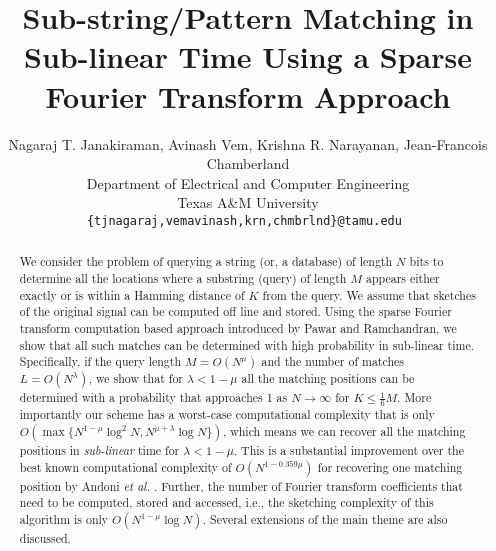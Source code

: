 \documentclass[sigconf]{acmart}
\begin{document}
\title[Sub-string Matching in Sub-linear Time]{Sub-string/Pattern Matching in Sub-linear Time Using a Sparse Fourier Transform Approach}

\author{Nagaraj T. Janakiraman, Avinash Vem, Krishna R. Narayanan, Jean-Francois Chamberland\\
Department of Electrical and Computer Engineering \\
Texas A\&M University\\
{\tt\small {\{tjnagaraj,vemavinash,krn,chmbrlnd\}@tamu.edu} }}

\renewcommand{\shortauthors}{Janakiraman et al.}

\begin{abstract}
	We consider the problem of querying a string (or, a database) of length $N$ bits to determine all the locations where a substring (query) of length $M$ appears either exactly or is within a Hamming distance of $K$ from the query. We assume that sketches of the original signal can be computed off line and stored. Using the sparse Fourier transform computation based approach introduced by Pawar and Ramchandran, we show that all such matches can be determined with high probability in sub-linear time. Specifically, if the query length $M = O(N^\mu)$ and the number of matches $L=O(N^\lambda)$, we show that for $\lambda < 1-\mu$ all the matching positions can be determined with a probability that approaches 1 as $N \rightarrow \infty$ for $K \leq \frac{1}{6}M$. More importantly our scheme has a worst-case computational complexity that is only $O\left(\max\{N^{1-\mu}\log^2 N, N^{\mu+\lambda}\log N \}\right)$, which means we can recover all the matching positions in {\it sub-linear} time for $\lambda<1-\mu$. This is a substantial improvement over the best known computational complexity of $O\left(N^{1-0.359 \mu} \right)$ for recovering one matching position by Andoni {\em et al.} \cite{andoni2013shift}. Further, the number of Fourier transform coefficients that need to be computed, stored and accessed, i.e., the sketching complexity of this algorithm is only $O\left(N^{1-\mu}\log N\right)$. Several extensions of the main theme are also discussed.
\end{abstract}
\end{document}
